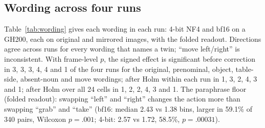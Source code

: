 \documentclass[conference]{IEEEtran}
\begin{document}
\subsection{Wording across four runs}
\label{app:wording}

Table~\ref{tab:wording} gives each wording in each run: 4-bit NF4 and bf16 on a GH200, each on original and mirrored images, with the folded readout. Directions agree across runs for every wording that names a twin; ``move left/right'' is inconsistent. With frame-level $p$, the signed effect is significant before correction in 3, 3, 3, 4, 4 and 1 of the four runs for the original, prenominal, object, table-side, absent-noun and move wordings; after Holm within each run in 1, 3, 2, 4, 3 and 1; after Holm over all 24 cells in 1, 2, 2, 4, 3 and 1. The paraphrase floor (folded readout): swapping ``left'' and ``right'' changes the action more than swapping ``grab'' and ``take'' (bf16: median 2.43 vs 1.38 bins, larger in 59.1\% of 340 pairs, Wilcoxon $p=.001$; 4-bit: 2.57 vs 1.72, 58.5\%, $p=.00031$).
\end{document}
